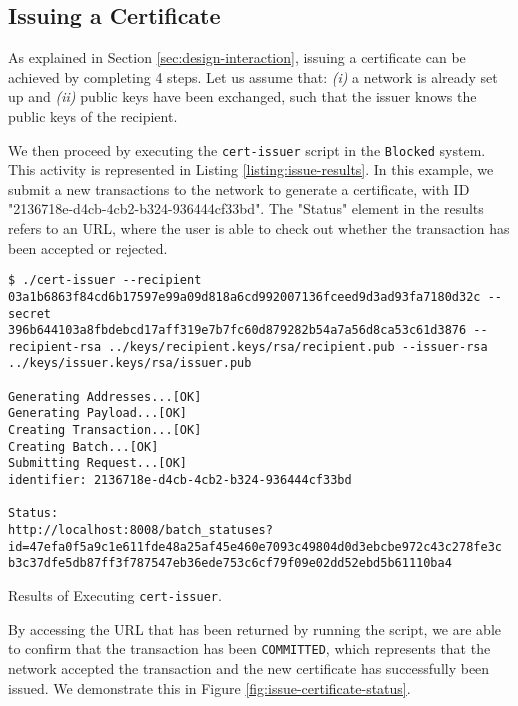 \subsection{Issuing a Certificate}
\label{sec:impl-issue}

As explained in Section \ref{sec:design-interaction}, issuing a certificate can be achieved by completing 4 steps. Let us assume that: \emph{(i)} a network is already set up and \emph{(ii)} public keys have been exchanged, such that the issuer knows the public keys of the recipient.

We then proceed by executing the \texttt{cert-issuer} script in the \texttt{Blocked} system. This activity is represented in Listing \ref{listing:issue-results}. In this example, we submit a new transactions to the network to generate a certificate, with ID "2136718e-d4cb-4cb2-b324-936444cf33bd". The "Status" element in the results refers to an URL, where the user is able to check out whether the transaction has been accepted or rejected.

\begin{listing}[ht]
	\begin{verbatim}
$ ./cert-issuer --recipient 03a1b6863f84cd6b17597e99a09d818a6cd992007136fceed9d3ad93fa7180d32c --secret 396b644103a8fbdebcd17aff319e7b7fc60d879282b54a7a56d8ca53c61d3876 --recipient-rsa ../keys/recipient.keys/rsa/recipient.pub --issuer-rsa ../keys/issuer.keys/rsa/issuer.pub

Generating Addresses...[OK]
Generating Payload...[OK]
Creating Transaction...[OK]
Creating Batch...[OK]
Submitting Request...[OK]
identifier: 2136718e-d4cb-4cb2-b324-936444cf33bd

Status:
http://localhost:8008/batch_statuses?id=47efa0f5a9c1e611fde48a25af45e460e7093c49804d0d3ebcbe972c43c278fe3c
b3c37dfe5db87ff3f787547eb36ede753c6cf79f09e02dd52ebd5b61110ba4

\end{verbatim}
	\caption{Results of Executing \texttt{cert-issuer}.}
	\label{listing:issue-results}
\end{listing}

By accessing the URL that has been returned by running the script, we are able to confirm that the transaction has been \texttt{COMMITTED}, which represents that the network accepted the transaction and the new certificate has successfully been issued. We demonstrate this in Figure \ref{fig:issue-certificate-status}.

